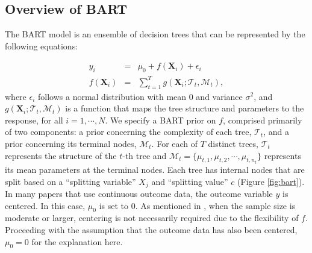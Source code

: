 \subsection{Overview of BART}
The BART model \citep{chipman2010bart} is an ensemble of decision trees that can be represented by the following equations: 
%

\begin{eqnarray*}
y_i &=&  \mu_0+f(\boldsymbol{X}_i) + \epsilon_i \\
 f(\boldsymbol{X}_i) &=& \sum_{t=1}^T g(\boldsymbol{X}_i ; \mathcal{T}_t, \mathcal{M}_t),
\end{eqnarray*}
%
where $\epsilon_i$ follows a normal distribution with mean 0 and variance $\sigma^2$, and $g(\boldsymbol{X}_i; \mathcal{T}_t, \mathcal{M}_t)$ is a function that maps the tree structure and parameters to the response, for all $i=1, \cdots, N$. We specify a BART prior on $f$, comprised primarily of two components: a prior concerning the complexity of each tree, $\mathcal{T}_t$, and a prior concerning its terminal nodes, $\mathcal{M}_t$. For each of $T$ distinct trees, $\mathcal{T}_t$ represents the structure of the $t$-th tree and $\mathcal{M}_t = \{\mu_{t,1}, \mu_{t,2}, \cdots, \mu_{t,n_t}\}$ represents its mean parameters at the terminal nodes. Each tree has internal nodes that are split based on a ``splitting variable'' $X_j$ and ``splitting value'' $c$ (Figure \ref{fig:bart}). In many papers that use continuous outcome data, the outcome variable $y$ is centered. In this case, $\mu_0$ is set to $0$. As mentioned in \cite{sparapani2016nonparametric}, when the sample size is moderate or larger, centering is not necessarily required due to the flexibility of $f$. Proceeding with the assumption that the outcome data has also been centered, $\mu_0 = 0$ for the explanation here.

